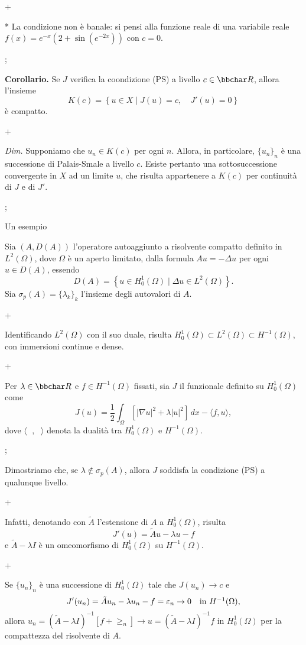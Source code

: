 \pg+

* La condizione non \`e banale: si pensi alla funzione reale di una variabile reale $f(x)=e^{-x}(2+\sin (e^{-2x}))$ con $c=0$.

\pg;

{\bf Corollario.} Se $J$ verifica la coondizione (PS) a livello $c \in \R$, allora l'insieme
$$
K(c) = \left\{ u \in X \mid J(u)=c, \quad J'(u)=0 \right\}
$$
\`e compatto.

\pg+

{\em Dim.} Supponiamo che $u_n \in K(c)$ per ogni $n$. Allora, in particolare, $\{u_n\}_n$ \`e una successione di Palais-Smale a livello $c$. Esiste pertanto una sottosuccessione convergente in $X$ ad un limite $u$, che risulta appartenere a $K(c)$ per continuit\`a di $J$ e di $J'$.

\pg;

\sec Un esempio

Sia $(A,D(A))$ l'operatore autoaggiunto a risolvente compatto definito in $L^2(\Omega)$, dove $\Omega$ \`e un aperto limitato, dalla formula $Au = -\Delta u$ per ogni $u \in D(A)$, essendo
$$
D(A) = \left\{ u \in H_0^1(\Omega) \mid \Delta u \in L^2 (\Omega) \right\}.
$$
Sia $\sigma_p(A)=\{\lambda_k\}_k$ l'insieme degli autovalori di $A$.

\pg+

Identificando $L^2(\Omega)$ con il suo duale, risulta $H_0^1(\Omega) \subset L^2(\Omega) \subset H^{-1}(\Omega)$, con immersioni continue e dense.

\pg+

Per $\lambda \in \R$ e $f \in H^{-1}(\Omega)$ fissati, sia $J$ il funzionale definito su $H_0^1(\Omega)$ come
$$
J(u) = \frac{1}{2} \int_\Omega \left[ |\nabla u|^2 + \lambda |u|^2 \right] \, dx - \langle f,u \rangle,
$$
dove $\langle \phantom{\cdot},\phantom{\cdot} \rangle$ denota la dualit\`a tra $H_0^1(\Omega)$ e $H^{-1}(\Omega)$.

\pg;

Dimostriamo che, se $\lambda \notin \sigma_p(A)$, allora $J$ soddisfa la condizione (PS) a qualunque livello.

\pg+

Infatti, denotando con $\tilde{A}$ l'estensione di $A$ a
$H_0^1(\Omega)$, risulta
$$
J'(u) = \tilde{A}u - \lambda u - f
$$
e $\tilde{A}-\lambda I$ \`e un omeomorfismo di $H_0^1(\Omega)$ su
$H^{-1}(\Omega)$.

\pg+

Se $\{u_n\}_n$ \`e una successione di $H_0^1(\Omega)$ tale che
$J(u_n)\to c$ e
$$
J'(u_n) = \tilde{A}u_n-\lambda u_n -f =\ge_n \to 0 \quad \hbox{in $H^{-1}(\Omega)$},
$$
allora $u_n = (\tilde{A}-\lambda I)^{-1} [f+\ge_n] \to u = (\tilde{A}-\lambda I)^{-1}f$  in $H_0^1(\Omega)$ per la compattezza del risolvente di $A$.

